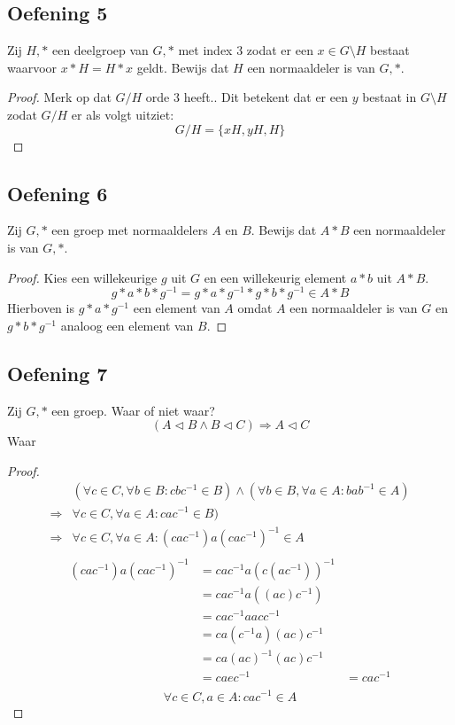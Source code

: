 \documentclass[main.tex]{subfiles}
\begin{document}
\subsection*{Oefening 5}
\label{sec:oz4-oef5}
Zij $H,*$ een deelgroep van $G,*$ met index $3$ zodat er een $x\in G\setminus H$ bestaat waarvoor $x*H = H*x$ geldt.
Bewijs dat $H$ een normaaldeler is van $G,*$.

\begin{proof}
  Merk op dat $G/H$ orde $3$ heeft..
  Dit betekent dat er een $y$ bestaat in $G\setminus H$ zodat $G/H$ er als volgt uitziet:
  \[ G/H = \{ xH, yH, H \} \]
\end{proof}

\subsection*{Oefening 6}
\label{sec:oz4-oef6}
Zij $G,*$ een groep met normaaldelers $A$ en $B$.
Bewijs dat $A*B$ een normaaldeler is van $G,*$.

\begin{proof}
  Kies een willekeurige $g$ uit $G$ en een willekeurig element $a*b$ uit $A*B$.
  \[ g*a*b*g^{-1} = g*a*g^{-1}*g*b*g^{-1} \in A*B\]
  Hierboven is $g*a*g^{-1}$ een element van $A$ omdat $A$ een normaaldeler is van $G$ en $g*b*g^{-1}$ analoog een element van $B$.
\end{proof}

\subsection*{Oefening 7}
\label{sec:oz4-oef7}
Zij $G,*$ een groep.
Waar of niet waar?
\[ (A \triangleleft B \wedge B \triangleleft C) \Rightarrow A \triangleleft C \]
Waar
\begin{proof}
  \[
  \begin{array}{rl}
    & (\forall c\in C,\forall b\in B: cbc^{-1} \in B) \wedge (\forall b\in B,\forall a\in A: bab^{-1} \in A)\\
    \Rightarrow & \forall c\in C,\forall a\in A: cac^{-1} \in B)\\
    \Rightarrow & \forall c\in C,\forall a\in A: (cac^{-1})a(cac^{-1})^{-1} \in A\\
  \end{array}
  \]
  \[
  \begin{array}{rll}
    (cac^{-1})a(cac^{-1})^{-1} &= cac^{-1}a(c(ac^{-1}))^{-1} &\\
                             &= cac^{-1}a((ac)c^{-1}) &\\
                             &= cac^{-1}aacc^{-1} &\\
                             &= ca(c^{-1}a)(ac)c^{-1} &\\
                             &= ca(ac)^{-1}(ac)c^{-1} &\\
                             &= caec^{-1} &= cac^{-1}\\
  \end{array}
  \]
  \[ \forall c\in C, a\in A: cac^{-1} \in A \]
\end{proof}
\end{document}
